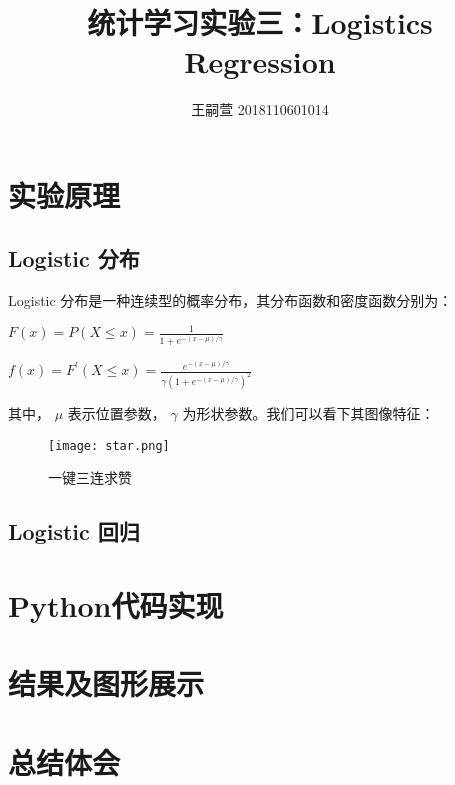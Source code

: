 \documentclass[lang=cn,10pt,a4paper,cite=authoryear]{elegantpaper}
\title{统计学习实验三：Logistics Regression}
\author{王嗣萱 2018110601014}
\date{}
\begin{document}
\maketitle

\section{实验原理}

\subsection{Logistic 分布}
Logistic 分布是一种连续型的概率分布，其分布函数和密度函数分别为：

$F(x) = P(X \leq x)=\frac{1}{1+e^{-(x-\mu)/\gamma}} $

$ f(x) = F^{'}(X \leq x)=\frac{e^{-(x-\mu)/\gamma}}{\gamma(1+e^{-(x-\mu)/\gamma})^{2}}$

其中， $\mu$ 表示位置参数， $\gamma$ 为形状参数。我们可以看下其图像特征：

\begin{figure}[htbp]
	\centering
	\texttt{[image: star.png]}
	\caption{一键三连求赞}
\end{figure}
\subsection{Logistic 回归}

\subsection{}

\section{Python代码实现}

\section{结果及图形展示}

\section{总结体会}
\end{document}
